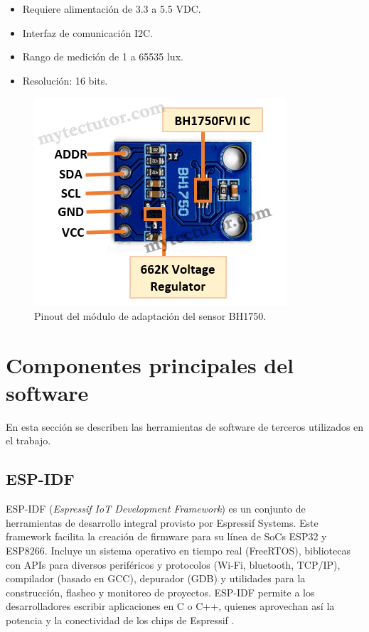 \begin{itemize}
	\item Requiere alimentación de 3.3 a 5.5 VDC.
	\item Interfaz de comunicación I2C.
	\item Rango de medición de 1 a 65535 lux.
	\item Resolución: 16 bits.
\end{itemize}

\begin{figure}[h]
\centering
\includegraphics[scale=.5]{./Figures/BH1750.png}
	\caption{Pinout del módulo de adaptación del sensor BH1750.}
	\label{fig:BH1750}
\end{figure}



\section{Componentes principales del software}
\label{sec:sw:components}
En esta sección se describen las herramientas de software de terceros utilizados en el trabajo.


\subsection{ESP-IDF}

ESP-IDF (\textit{Espressif IoT Development Framework}) es un conjunto de herramientas de desarrollo integral provisto por Espressif Systems. Este framework facilita la creación de firmware para su línea de SoCs ESP32 y ESP8266. Incluye un sistema operativo en tiempo real (FreeRTOS), bibliotecas con APIs para diversos periféricos y protocolos (Wi-Fi, bluetooth, TCP/IP), compilador (basado en GCC), depurador (GDB) y utilidades para la construcción, flasheo y monitoreo de proyectos. ESP-IDF permite a los desarrolladores escribir aplicaciones en C o C++, quienes aprovechan así la potencia y la conectividad de los chips de Espressif \cite{ESPIDF}.


